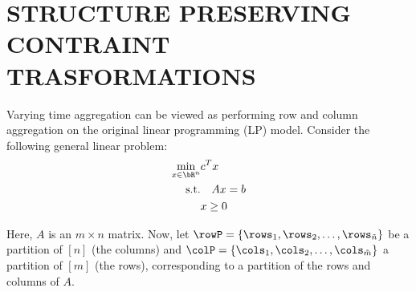 

















\section{STRUCTURE PRESERVING CONTRAINT TRASFORMATIONS}\label{appendix B}

Varying time aggregation can be viewed as performing row and column aggregation on the original linear programming (LP) model. Consider the following general linear problem:
\begin{align}
\label{eq:LP}
\min_{x \in \bR^{n}} &c^T x \\ 
\text{s.t.} &\quad Ax = b \\
&x \geq 0
\end{align}

Here, \(A\) is an \(m \times n\) matrix. Now, let \(\rowP = \{\rows_1, \rows_2, \ldots, \rows_{\tilde{n}}\}\) be a partition of \([n]\) (the columns) and \(\colP = \{\cols_1, \cols_2, \ldots, \cols_{\tilde{m}}\}\) a partition of \([m]\) (the rows), corresponding to a partition of the rows and columns of \(A\).

